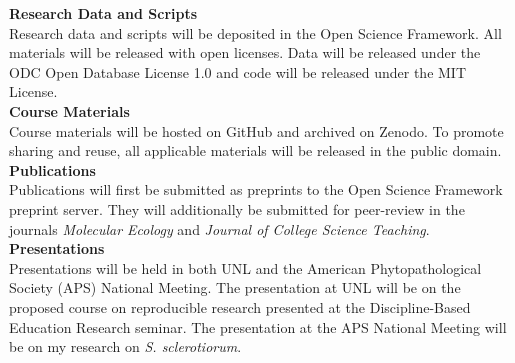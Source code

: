 \documentclass[12pt,letterpaper]{article}
\begin{document}
\noindent \textbf{Research Data and Scripts}\\
Research data and scripts will be deposited in the Open Science Framework. All materials will be released with open licenses. Data will be released under the ODC Open Database License 1.0 and code will be released under the MIT License. \\
\noindent \textbf{Course Materials}\\
Course materials will be hosted on GitHub and archived on Zenodo. To promote sharing and reuse, all applicable materials will be released in the public domain. \\
\noindent \textbf{Publications}\\
Publications will first be submitted as preprints to the Open Science Framework preprint server. They will additionally be submitted for peer-review in the journals \textit{Molecular Ecology} and \textit{Journal of College Science Teaching}. \\
\noindent \textbf{Presentations}\\
Presentations will be held in both UNL and the American Phytopathological Society (APS) National Meeting. The presentation at UNL will be on the proposed course on reproducible research presented at the Discipline-Based Education Research seminar. The presentation at the APS National Meeting will be on my research on \textit{S. sclerotiorum}.


\newpage
\AtBeginShipout{%
\AtBeginShipoutDiscard
}

\printbibliography
\end{document}
